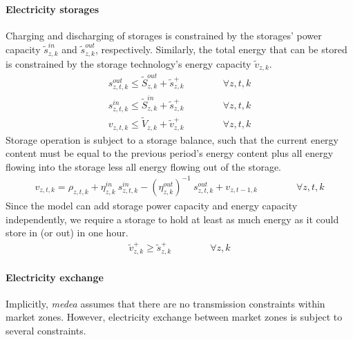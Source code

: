 \documentclass[11pt,a4paper]{article}
\begin{document}
\paragraph{Electricity storages}
Charging and discharging of storages is constrained by the storages' power capacity $\widetilde{s}^{in}_{z,k}$ and $\widetilde{s}^{out}_{z,k}$, respectively. Similarly, the total energy that can be stored is constrained by the storage technology's energy capacity $\widetilde{v}_{z,k}$.
\begin{align}
s^{out}_{z,t,k} \leq \widetilde{S}^{out}_{z,k} + \widetilde{s}^{+}_{z,k} \qquad \qquad \forall z,t,k \\
s^{in}_{z,t,k} \leq \widetilde{S}^{in}_{z,k} + \widetilde{s}^{+}_{z,k} \qquad \qquad \forall z,t,k \\
v_{z,t,k} \leq \widetilde{V}_{z,k} + \widetilde{v}^{+}_{z,k} \qquad \qquad \forall z,t,k
\end{align}
Storage operation is subject to a storage balance, such that the current energy content must be equal to the previous period's energy content plus all energy flowing into the storage less all energy flowing out of the storage.
\begin{align}
v_{z,t,k} = \rho_{z,t,k} + \eta^{in}_{z,k} \: s^{in}_{z,t,k} - (\eta^{out}_{z,k})^{-1} \: s^{out}_{z,t,k} + v_{z,t-1,k} \qquad \qquad \forall z,t,k
\end{align}
Since the model can add storage power capacity and energy capacity independently, we require a storage to hold at least as much energy as it could store in (or out) in one hour.
\begin{align}
\widetilde{v}^{+}_{z,k} \geq \widetilde{s}^{+}_{z,k} \qquad \qquad \forall z,k
\end{align}

\paragraph{Electricity exchange}
Implicitly, \emph{medea} assumes that there are no transmission constraints within market zones. 
However, electricity exchange between market zones is subject to several constraints.
\end{document}
